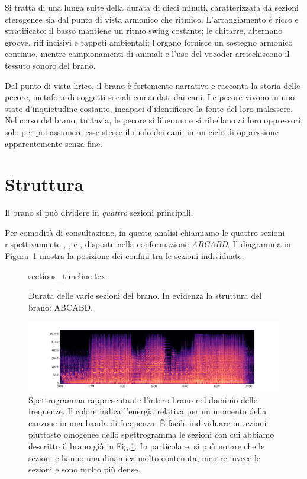 \documentclass[class=book, crop=false, oneside, 12pt]{standalone}
\begin{document}
    Si tratta di una lunga suite della durata di dieci minuti, caratterizzata da sezioni eterogenee sia dal punto di vista armonico che ritmico. L'arrangiamento è ricco e stratificato: il basso 
    mantiene un ritmo swing costante; le chitarre, alternano groove, riff incisivi e tappeti ambientali; l'organo fornisce un sostegno armonico continuo, mentre campionamenti di animali e l'uso del vocoder arricchiscono il tessuto sonoro del brano.

    Dal punto di vista lirico, il brano è fortemente narrativo e racconta la storia delle pecore, metafora di soggetti sociali comandati dai cani. Le pecore vivono in uno stato d'inquietudine costante, incapaci d'identificare la fonte del loro malessere. Nel corso del brano, tuttavia, le pecore si liberano e si ribellano ai loro oppressori, solo per poi assumere esse stesse il ruolo dei cani, in un ciclo di oppressione apparentemente senza fine.

    \section{Struttura}
    \label{sec:04-struttura}

    Il brano si può dividere in \emph{quattro} sezioni principali.

    Per comodità di consultazione, in questa analisi chiamiamo le quattro sezioni rispettivamente , ,  e , disposte nella conformazione \emph{ABCABD}. Il diagramma in Figura~\ref{fig:04-sections-timeline} mostra la posizione dei confini tra le sezioni individuate.

    \begin{figure}[htb]
        \centering
        {sections_timeline.tex}
        \caption[Durata delle varie sezioni del brano.]{Durata delle varie sezioni del brano. In evidenza la struttura del brano: ABCABD.}
        \label{fig:04-sections-timeline}
    \end{figure}

    \begin{figure}[htb]
        \centering
        \includegraphics[width=\textwidth]{sheep_spectrogram.png}
        \caption[Spettrogramma rappresentante l'intero brano nel dominio delle frequenze.]{Spettrogramma rappresentante l'intero brano nel dominio delle frequenze. Il colore indica l'energia relativa per un momento della canzone in una banda di frequenza. È facile individuare in sezioni piuttosto omogenee dello spettrogramma le sezioni con cui abbiamo descritto il brano già in Fig.\ref{fig:04-sections-timeline}. In particolare, si può notare che  le sezioni  e  hanno una dinamica molto contenuta, mentre invece le sezioni  e  sono molto più dense.}
        \label{fig:sheep-spectrogram}
    \end{figure}
\end{document}

